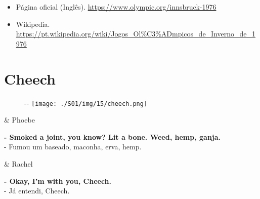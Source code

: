 \begin{itemize}
\tightlist
\item
  \sloppy Página oficial (Inglês). \url{https://www.olympic.org/innsbruck-1976}
\item
  \sloppy Wikipedia. \url{https://pt.wikipedia.org/wiki/Jogos_Ol%C3%ADmpicos_de_Inverno_de_1976}
\end{itemize}

\hypertarget{cheech}{%
\section{Cheech}\label{cheech}}

\begin{figure}[!ht]
  \begin{adjustwidth}{-\oddsidemargin-1in}{-\rightmargin}
    \centering
    \texttt{[image: ./S01/img/15/cheech.png]}
  \end{adjustwidth}
\end{figure}

\begin{tcolorbox}[enhanced,center upper,
    drop fuzzy shadow southeast, boxrule=0.3pt,
    lower separated=false,
    colframe=black!30!dialogoBorder,colback=white]
\begin{minipage}[c]{0.16\linewidth}
   & \centering \scriptsize{Phoebe}
\end{minipage}
\hfill
\begin{minipage}[c]{0.8\linewidth}
  \textbf{- Smoked a joint, you know? Lit a bone. Weed, hemp, ganja.}\\
  - Fumou um baseado, maconha, erva, hemp.
\end{minipage}

\medskip
\begin{minipage}[c]{0.16\linewidth}
   & \centering \scriptsize{Rachel}
\end{minipage}
\hfill
\begin{minipage}[c]{0.8\linewidth}
  \textbf{- Okay, I'm with you, Cheech.}\\
  - Já entendi, Cheech.
\end{minipage}
\end{tcolorbox}

